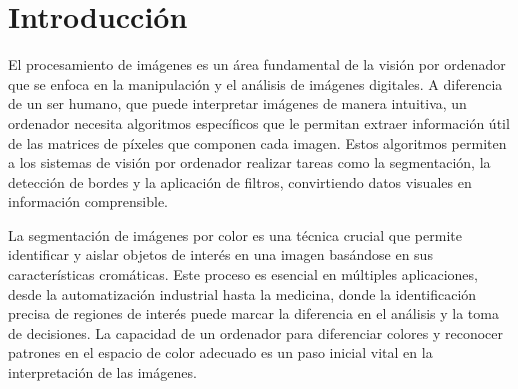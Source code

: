 \documentclass[a4paper,12pt]{article}
\newcommand{\vacio}{\textcolor{white}{ .}}
\begin{document}
{%

\renewcommand{\headrulewidth}{0.5pt}
\fancyhead[L]{\vacio}

\pagestyle{fancy}
\renewcommand{\footrulewidth}{0.5pt}
\fancyfoot[C]{\vacio}

\newpage

\renewcommand{\contentsname}{Índice}
\tableofcontents
{}

\newpage

\section{Introducción}

El procesamiento de imágenes es un área fundamental de la visión por ordenador que se enfoca en la manipulación y el análisis
de imágenes digitales. A diferencia de un ser humano, que puede interpretar imágenes de manera intuitiva, un ordenador necesita
algoritmos específicos que le permitan extraer información útil de las matrices de píxeles que componen cada imagen. Estos 
algoritmos permiten a los sistemas de visión por ordenador realizar tareas como la segmentación, la detección de bordes 
y la aplicación de filtros, convirtiendo datos visuales en información comprensible.

\vspace{0.5cm}
La segmentación de imágenes por color es una técnica crucial que permite identificar y aislar objetos de interés en una imagen 
basándose en sus características cromáticas. Este proceso es esencial en múltiples aplicaciones, desde la automatización 
industrial hasta la medicina, donde la identificación precisa de regiones de interés puede marcar la diferencia en el análisis
y la toma de decisiones. La capacidad de un ordenador para diferenciar colores y reconocer patrones en el espacio de color 
adecuado es un paso inicial vital en la interpretación de las imágenes.

}
\end{document}
